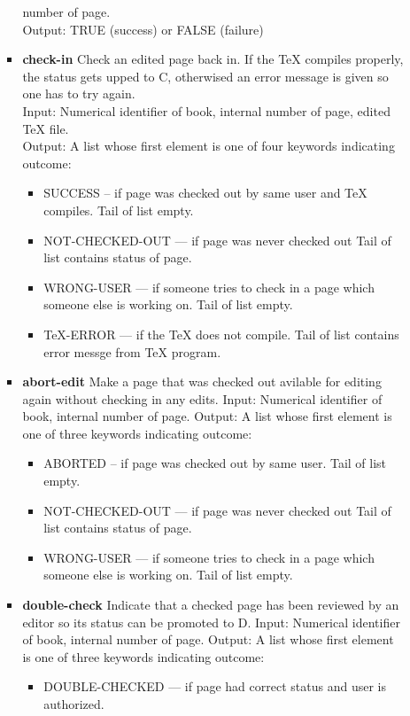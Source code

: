 \begin{itemize}
\begin{itemize}
\begin{itemize}
  number of page.\\  Output: TRUE (success) or FALSE (failure)
\item
  {\bf check-in}  Check an edited page back in. If the TeX compiles
  properly, the status gets upped to C, otherwised an error message is
  given so one has to try again.\\  Input: Numerical identifier of book,
  internal number of page, edited TeX file.\\  Output: A list whose first
  element is one of four keywords indicating outcome:
  \begin{itemize}
  \item SUCCESS
    -- if page was checked out by same user and TeX compiles. Tail of list
    empty. 
  \item NOT-CHECKED-OUT --- if page was never checked out Tail
    of list contains status of page. 
  \item WRONG-USER --- if someone
    tries to check in a page which someone else is working on. Tail of
    list empty. 
  \item TeX-ERROR --- if the TeX does not compile. Tail
    of list contains error messge from TeX program.
  \end{itemize}
\item 
  {\bf abort-edit}  Make a page that was checked out avilable for editing
  again without checking in any edits.  Input: Numerical identifier of
  book, internal number of page.  Output: A list whose first element is
  one of three keywords indicating outcome:
\begin{itemize}
 \item ABORTED -- if page
  was checked out by same user. Tail of list empty. 
\item
  NOT-CHECKED-OUT --- if page was never checked out Tail of list
  contains status of page. 
\item WRONG-USER --- if someone tries to
  check in a page which someone else is working on. Tail of list empty.
\end{itemize}
\item
  {\bf double-check}  Indicate that a checked page has been reviewed by an
  editor so its status can be promoted to D.  Input: Numerical
  identifier of book, internal number of page.  Output: A list whose
  first element is one of three keywords indicating outcome:
  \begin{itemize}
  \item
    DOUBLE-CHECKED --- if page had correct status and user is authorized.

\end{itemize}
\end{itemize}
\end{itemize}
\end{itemize}

